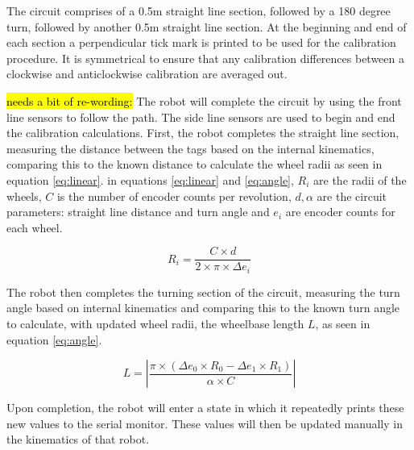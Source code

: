 \documentclass[conference]{IEEEtran}
\begin{document}
The circuit comprises of a 0.5m straight line section, followed by a 180 degree turn, followed by another 0.5m straight line section. 
At the beginning and end of each section a perpendicular tick mark is printed to be used for the calibration procedure. 
It is symmetrical to ensure that any calibration differences between a clockwise and anticlockwise calibration are averaged out.

\hl{needs a bit of re-wording:}
The robot will complete the circuit by using the front line sensors to follow the path. 
The side line sensors are used to begin and end the calibration calculations. 
First, the robot completes the straight line section, measuring the distance between the tags based on the internal kinematics, comparing this to the known distance to calculate the wheel radii as seen in equation \ref{eq:linear}. in equations \ref{eq:linear} and \ref{eq:angle}, $R_i$ are the radii of the wheels, $C$ is the number of encoder counts per revolution, $d,\alpha$ are the circuit parameters: straight line distance and turn angle and $e_i$ are encoder counts for each wheel.

\begin{equation}
\label{eq:linear}
    R_i = \frac{C \times d}{2 \times \pi \times \Delta e_i}
\end{equation}

The robot then completes the turning section of the circuit, measuring the turn angle based on internal kinematics and comparing this to the known turn angle to calculate, with updated wheel radii, the wheelbase length $L$, as seen in equation \ref{eq:angle}.

\begin{equation}
\label{eq:angle}
L = \left|\frac{\pi \times (\Delta e_0 \times R_0 - \Delta e_1 \times R_1)}{\alpha \times C}\right|
\end{equation}

Upon completion, the robot will enter a state in which it repeatedly prints these new values to the serial monitor. These values will then be updated manually in the kinematics of that robot.



\end{document}

